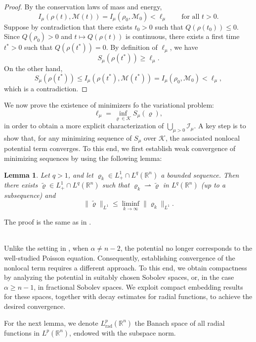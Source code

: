 \documentclass[reqno,11pt]{amsart}
\numberwithin{equation}{section}
\newcommand{\R}{\mathbb{R}}
\newtheorem{lemma}[theorem]{Lemma}
\theoremstyle{definition}
\begin{document}
\begin{proof}
By the conservation laws of mass and energy,
\[
I_\mu(\rho(t),\mathcal{M}(t)) = I_\mu(\rho_0,\mathcal{M}_0) < \ell_\mu
\qquad \text{for all } t >0.
\]
Suppose by contradiction that there exists $t_0>0$ such that $Q(\rho(t_0))\le 0$.
Since $Q(\rho_0)>0$ and $t\mapsto Q(\rho(t))$ is continuous,
there exists a first time $t^\ast>0$ such that $Q(\rho(t^\ast))=0$.
By definition of $\ell_\mu$, we have
\[
S_\mu(\rho(t^\ast))\ge \ell_\mu.
\]
On the other hand,
\[
S_\mu(\rho(t^\ast))
\le I_\mu(\rho(t^\ast),\mathcal{M}(t^\ast))
= I_\mu(\rho_0,\mathcal{M}_0)
< \ell_\mu,
\]
which is a contradiction.
\end{proof}

We now prove the existence of minimizers fo the variational problem:
$$
\ell_\mu = \inf_{\varrho \in \mathcal{K}} S_\mu(\varrho),
$$ 
in order to obtain a more explicit characterization of 
$\bigcup_{\mu > 0} \mathcal{I}_\mu$.
A key step is to show that, for any minimizing sequence of $S_\mu$ over $\mathcal{K}$, 
the associated nonlocal potential term converges. 
To this end, we first establish weak convergence of minimizing sequences 
by using the following lemma:

\begin{lemma}\label{weaklowersemi}
Let $q > 1$, and let $\varrho_k \in L^1_+ \cap L^q (\mathbb{R}^n)$ a bounded sequence. 
Then there exists $\tilde{\varrho} \in L^1_+ \cap L^q (\mathbb{R}^n)$ 
such that  $\varrho_k \rightharpoonup \tilde{\varrho}$ 
in $L^q(\R^n)$ {\rm(}up to a subsequence{\rm)} and
    \[
    \|\tilde{\varrho}\|_{L^1} \leq \liminf_{k \to \infty} \|\varrho_k\|_{L^1}.
    \]
\end{lemma}
The proof is the same as in \cite{Cheng_2025}. \\\

Unlike the setting in \cite{Cheng_2025}, when $\alpha \neq n-2$, 
the potential no longer corresponds to the well-studied Poisson equation. 
Consequently, establishing convergence of the nonlocal term requires 
a different approach.
To this end, we obtain compactness by analyzing the potential in suitably chosen Sobolev spaces, 
or, in the case $\alpha \geq n-1$, in fractional Sobolev spaces. 
We exploit compact embedding results for these spaces, together with decay estimates 
for radial functions, to achieve the desired convergence.

For the next lemma, we denote $L^p_{\text{rad}}(\mathbb{R}^n)$ the Banach space of all radial 
functions in $L^p(\mathbb{R}^n)$, endowed with the subspace norm.
\end{document}
